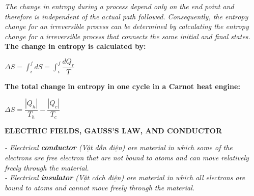 \documentclass[10pt]{article}
\begin{document}
\begin{enumerate}
	 \textit{The change in entropy during a process depend only on the end point and therefore is independent of the actual path followed. Consequently, the entropy change for an irreversible process can be determined by calculating the entropy change for a irreversible process that connects the same initial and final states.}\\
	 \textbf{The change in entropy is calculated by:}
	 \begin{mybox}
	 \begin{center}
	 $\Delta S = \displaystyle \int_i^f dS = \int_i^f \dfrac{dQ_r}{T}$
	 \end{center}
	 \end{mybox}
	 \textbf{The total change in entropy in one cycle in a Carnot heat engine:}
	 \begin{mybox}
	 \begin{center}
	 $\Delta S = \dfrac{|Q_h|}{T_h} - \dfrac{|Q_c|}{T_c}$
	 \end{center}
	\end{mybox}
\end{enumerate}
\pagebreak
\begin{center}
\textbf{ELECTRIC FIELDS, GAUSS'S LAW, AND CONDUCTOR}
\end{center}
\textit{ - Electrical \textbf{conductor} (Vật dẫn điện) are material in which some of the electrons are free electron that are not bound to atoms and can move relatively freely through the material.}\\
\textit{ - Electrical \textbf{insulator} (Vật cách điện) are material in which all electrons are bound to atoms and cannot move freely through the material.}
\end{document}
